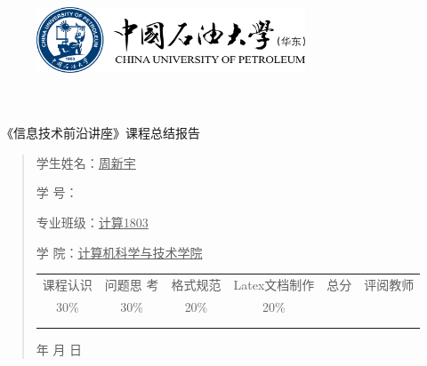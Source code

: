\documentclass{article}
\renewcommand{\today}{\number\year 年 \number\month 月 \number\day 日}
\begin{document}
\begin{figure}
    \centering
    \includegraphics[width=8cm]{upc.png}

    \label{figupc}
\end{figure}

	\begin{center}
		\quad \\
		\quad \\
		\heiti \fontsize{45}{17} \quad \quad \quad 
		\vskip 1.5cm
		\heiti {} 《信息技术前沿讲座》课程总结报告
	\end{center}
	\vskip 2.0cm
		
	\begin{quotation}
	\doublespacing
	
	\par\setlength\parindent{7em}
	\quad 
	
	学生姓名：\underline{\qquad  周新宇 \qquad \qquad}
	
	学\hspace{0.61cm} 号：\underline{\qquad}
	
	专业班级：\underline{\qquad 计算1803 \qquad  }
	
	学\hspace{0.61cm} 院：\underline{计算机科学与技术学院}
		\vskip 2cm
		\centering
		\begin{table}[h]
            \centering 
            \begin{tabular}{|c|c|c|c|c|c|}
                \hline
                课程认识 & 问题思 考 & 格式规范  & Latex文档制作   & 总分 & 评阅教师 \\
                30\% & 30\% & 20\% & 20\%  &  &  \\
                \hline
                 & & & &  &\\
                & & & &  &\\
                \hline
            \end{tabular}
        \end{table}
		\vskip 2cm
		\today
	\end{quotation}
\thispagestyle{empty}
\newpage
\setcounter{page}{1}
\end{document}
